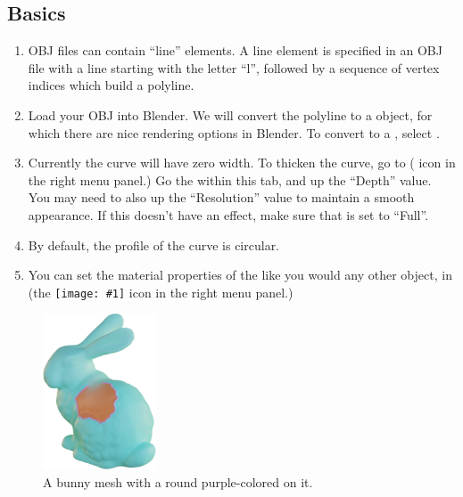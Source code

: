 \documentclass[10pt]{article}
\newcommand{\obj}[1]{\menu{\color{magenta} #1}}
\DeclareRobustCommand{\inlinepic}[1]{%
  \begingroup\normalfont
  \texttt{[image: \#1]}%
  \endgroup
}
\begin{document}
\subsection{Basics}
\begin{enumerate}
    \item OBJ files can contain ``line'' elements. A line element is specified in an OBJ file with a line starting with the letter ``l'', followed by a sequence of vertex indices which build a polyline. 
    \item Load your OBJ into Blender. We will convert the polyline to a \obj{Curve} object, for which there are nice rendering options in Blender. To convert to a \obj{Curve}, select .
    \item Currently the curve will have zero width. To thicken the curve, go to  ( icon in the right menu panel.) Go the  within this tab, and up the ``Depth'' value. You may need to also up the ``Resolution'' value to maintain a smooth appearance. If this doesn't have an effect, make sure that  is set to ``Full''.
    \item By default, the profile of the curve is circular.
    \item You can set the material properties of the \obj{Curve} like you would any other object, in  (the \inlinepic{images/material-properties-icon.png} icon in the right menu panel.)
\end{enumerate}

\begin{figure}[H]
    \centering
    \includegraphics[width=0.3\textwidth]{images/bunny-with-round-curve.png}
    \caption{A bunny mesh with a round purple-colored \obj{Curve} on it.}
    \label{fig:curve}
\end{figure}
\end{document}
